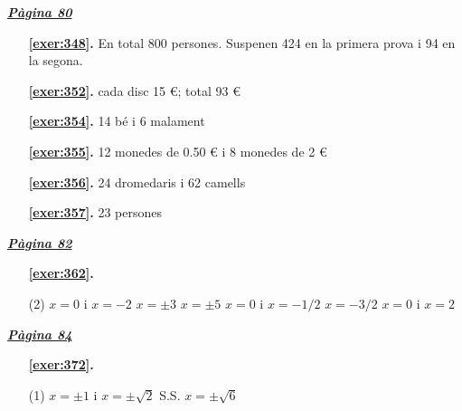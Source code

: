 
\hyperlink{page.80}{\textbf{\em Pàgina 80}}
\begin{enumerate}
\item[\fontfamily{phv}\selectfont\color{blue}\textbf{\ref{exer:348}. }] \label{ans:348} 
En total 800 persones. Suspenen 424 en la primera prova i 94 en la segona.
 \end{enumerate}
\begin{enumerate}
\item[\fontfamily{phv}\selectfont\color{blue}\textbf{\ref{exer:352}. }] \label{ans:352} 
cada disc 15 \euro {}; total 93 \euro {}
\item[\fontfamily{phv}\selectfont\color{blue}\textbf{\ref{exer:354}. }] \label{ans:354} 
14 bé i 6 malament
\item[\fontfamily{phv}\selectfont\color{blue}\textbf{\ref{exer:355}. }] \label{ans:355} 
12 monedes de 0.50 \euro {} i 8 monedes de 2 \euro {}
\item[\fontfamily{phv}\selectfont\color{blue}\textbf{\ref{exer:356}. }] \label{ans:356} 
24 dromedaris i 62 camells
\item[\fontfamily{phv}\selectfont\color{blue}\textbf{\ref{exer:357}. }] \label{ans:357} 
23 persones
 \end{enumerate}
\vspace{0.3cm}


\hyperlink{page.82}{\textbf{\em Pàgina 82}}
\begin{enumerate}



 \item[\fontfamily{phv}\selectfont\color{blue}\textbf{\ref{exer:362}. }] \label{ans:362}
 \begin{tasks}[column-sep=1em, item-indent=1.3333em](2)
	 \task $x=0$ i $x=-2$
	 \task $x=\pm 3$
	 \task $x=\pm 5$
	 \task $x=0$ i $x=-1/2$
	 \task $x=-3/2$
	 \task $x=0$ i $x=2$
\end{tasks}
 \end{enumerate}
\vspace{0.3cm}


\hyperlink{page.84}{\textbf{\em Pàgina 84}}
\begin{enumerate}



 \item[\fontfamily{phv}\selectfont\color{blue}\textbf{\ref{exer:372}. }] \label{ans:372}
 \begin{tasks}[column-sep=1em, item-indent=1.3333em](1)
	 \task $x=\pm 1$ i $x=\pm \sqrt {2}$
	 \task S.S.
	 \task $x=\pm \sqrt {6}$
\end{tasks}
 \end{enumerate}
\vspace{0.3cm}

